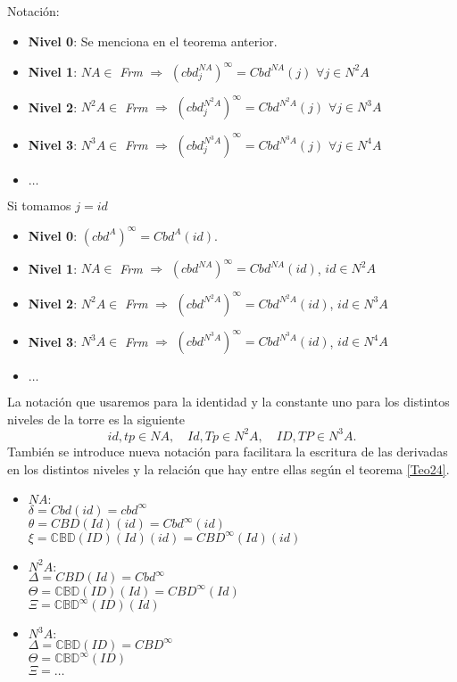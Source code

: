 \documentclass[12pt,letterpaper,titlepage]{article}
\theoremstyle{definition}
\newcommand\<{\langle}
\renewcommand\>{\rangle}
\begin{document}
\begin{description}
\item[Notación:]
\end{description}
\begin{itemize}
\item \textbf{Nivel 0}: Se menciona en el teorema anterior.
\item \textbf{Nivel 1}: $NA\in$ \textit{Frm} $\Rightarrow$ $(cbd_j^{NA})^\infty=Cbd^{NA}(j)$ $\forall j\in N^2A$
\item \textbf{Nivel 2}: $N^2A\in$ \textit{Frm} $\Rightarrow$ $(cbd_j^{N^2A})^\infty=Cbd^{N^2A}(j)$ $\forall j\in N^3A$
\item \textbf{Nivel 3}: $N^3A\in$ \textit{Frm} $\Rightarrow$ $(cbd_j^{N^3A})^\infty=Cbd^{N^3A}(j)$ $\forall j\in N^4A$
\item $\ldots$
\end{itemize}

Si tomamos $j=id$ 
\begin{itemize}
\item \textbf{Nivel 0}: $(cbd^A)^\infty=Cbd^A(id)$.
\item \textbf{Nivel 1}: $NA\in$ \textit{Frm} $\Rightarrow$ $(cbd^{NA})^\infty=Cbd^{NA}(id)$, $id\in N^2A$
\item \textbf{Nivel 2}: $N^2A\in$ \textit{Frm} $\Rightarrow$ $(cbd^{N^2A})^\infty=Cbd^{N^2A}(id)$, $id\in N^3A$
\item \textbf{Nivel 3}: $N^3A\in$ \textit{Frm} $\Rightarrow$ $(cbd^{N^3A})^\infty=Cbd^{N^3A}(id)$,  $id\in N^4A$
\item $\ldots$
\end{itemize}

La notación que usaremos para la identidad y la constante uno para los distintos niveles de la torre es la siguiente $$id, tp\in NA,\quad Id,Tp\in N^2A,\quad ID, TP\in N^3A.$$
También se introduce nueva notación para facilitara la escritura de las derivadas en los distintos niveles y la relación que hay entre ellas según el teorema \ref{Teo24}.
\begin{itemize}
\item \textbf{$NA:$}\\
$\delta=Cbd(id)=cbd^\infty$\\
$\theta=CBD(Id)(id)=Cbd^\infty(id)$\\
$\xi =\mathbb{CBD}(ID)(Id)(id)=CBD^\infty(Id)(id)$

\item \textbf{$N^2A:$}\\
$\Delta =CBD(Id)=Cbd^\infty$\\
$\Theta =\mathbb{CBD}(ID)(Id)=CBD^\infty(Id)$\\
$\Xi =\mathbb{CBD}^\infty(ID)(Id)$

\item \textbf{$N^3A:$}\\
$\Delta=\mathbb{CBD}(ID)=CBD^\infty$\\
$\Theta=\mathbb{CBD}^\infty(ID)$\\
$\Xi=\ldots$
\end{itemize}
\end{document}

